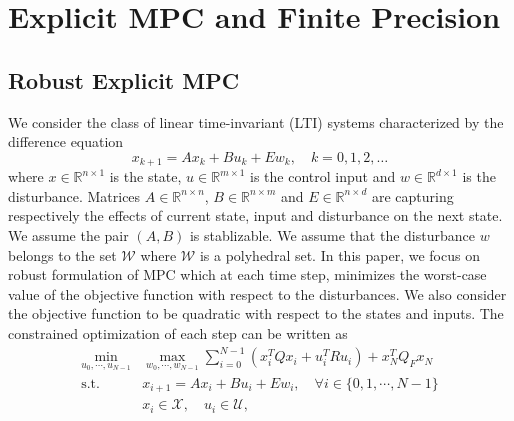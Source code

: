 \section{Explicit MPC and Finite Precision}
\subsection{Robust Explicit MPC}
\def\reals{\mathbb{R}}
We consider the class of linear time-invariant (LTI) systems characterized by the difference equation
\begin{equation}
\label{eq:DSS}
x_{k+1}=Ax_k+Bu_k+Ew_k,\quad  k=0,1,2,\ldots
\end{equation}
where $x\in \reals^{n\times 1}$ is the state, $u\in \reals^{m\times 1}$ is the control input and $w\in \reals^{d\times 1}$ is the disturbance. Matrices $A\in \reals^{n\times n}$, $B\in \reals^{n\times m}$ and $E\in \reals^{n\times d}$ are capturing respectively the effects of current state, input and disturbance on the next state. We assume the pair $(A,B)$ is stablizable.
We assume that the disturbance $w$ belongs to the set $\mathcal{W}$ where $\mathcal{W}$ is a polyhedral set.
In this paper, we focus on robust formulation of MPC which at each time step, minimizes the worst-case value of the objective function with respect to the disturbances. We also consider the objective function to be quadratic with respect to the states and inputs. The constrained optimization of each step can be written as
\begin{align}
\label{eq:RMPC_prob}
\min_{u_0,\cdots,u_{N-1}}& \max_{w_0,\cdots,w_{N-1}} \sum_{i=0}^{N-1}(x_i^TQx_i+u_i^TRu_i) + x_N^TQ_Fx_N\nonumber\\
\text{s.t.} \quad &x_{i+1}=Ax_i+Bu_i + E w_i, \quad\forall i\in\{0,1,\cdots,N-1\}\\
&x_i\in\mathcal{X},\quad u_i\in \mathcal{U},\nonumber
\end{align}

